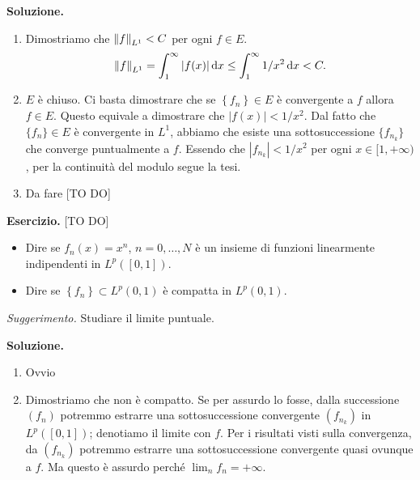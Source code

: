 \textbf{Soluzione.}
\begin{enumerate}

	\item Dimostriamo che $\left\lVert f \right\rVert_{L^1} < C$ per ogni $f \in E$.
	$$
	\left\lVert f \right\rVert_{L^1} = \int_1^\infty |f(x)| \,\mathrm{d} x \leq \int_1^\infty 1/x^2 \,\mathrm{d} x < C.
	$$

	\item $E$ è chiuso. Ci basta dimostrare che se $\left\{ f_n \right\} \in E$ è convergente a $f$ allora $f \in E$. Questo equivale a dimostrare che $|f(x)| < 1/x^2$.
	Dal fatto che $\{f_n\} \in E$ è convergente in $L^1$, abbiamo che esiste una sottosuccessione $\{f_{n_k}\}$ che converge puntualmente a $f$. Essendo che $|f_{n_k}| < 1/x^2$ per ogni $x \in [1,+\infty)$, per la continuità del modulo segue la tesi.

	\item Da fare [TO DO]

\end{enumerate}

\textbf{Esercizio.} [TO DO] 
\begin{itemize}
\item Dire se $f_n(x) = x^n$, $n = 0,\ldots , N$ è un insieme di funzioni linearmente indipendenti in $L^p([0,1])$.

\item Dire se $\left\{ f_n \right\} \subset L^p(0,1)$ è compatta in $L^p(0,1)$.
\end{itemize}
\textit{Suggerimento.} Studiare il limite puntuale.

\textbf{Soluzione.}
\begin{enumerate}

	\item Ovvio


	\item Dimostriamo che non è compatto. Se per assurdo lo fosse, dalla successione $(f_n)$ potremmo estrarre una sottosuccessione convergente $(f_{n_k})$ in $L^p([0,1])$; denotiamo il limite con $f$. Per i risultati visti sulla convergenza, da $(f_{n_k})$ potremmo estrarre una sottosuccessione convergente quasi ovunque a $f$. Ma questo è assurdo perché $\lim_n f_n = +\infty$.
\end{enumerate}


